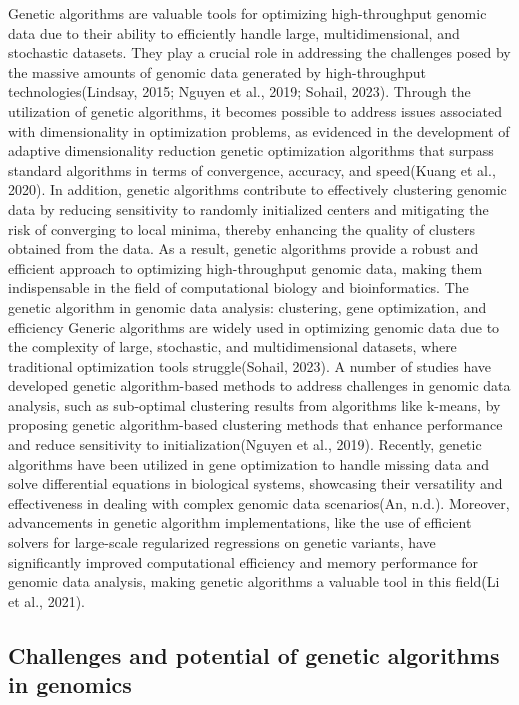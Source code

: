 \documentclass[
]{article}
\begin{document}
Genetic algorithms are valuable tools for optimizing high-throughput
genomic data due to their ability to efficiently handle large,
multidimensional, and stochastic datasets. They play a crucial role in
addressing the challenges posed by the massive amounts of genomic data
generated by high-throughput technologies(Lindsay, 2015; Nguyen et al.,
2019; Sohail, 2023). Through the utilization of genetic algorithms, it
becomes possible to address issues associated with dimensionality in
optimization problems, as evidenced in the development of adaptive
dimensionality reduction genetic optimization algorithms that surpass
standard algorithms in terms of convergence, accuracy, and speed(Kuang
et al., 2020). In addition, genetic algorithms contribute to effectively
clustering genomic data by reducing sensitivity to randomly initialized
centers and mitigating the risk of converging to local minima, thereby
enhancing the quality of clusters obtained from the data. As a result,
genetic algorithms provide a robust and efficient approach to optimizing
high-throughput genomic data, making them indispensable in the field of
computational biology and bioinformatics. The genetic algorithm in
genomic data analysis: clustering, gene optimization, and efficiency
Generic algorithms are widely used in optimizing genomic data due to the
complexity of large, stochastic, and multidimensional datasets, where
traditional optimization tools struggle(Sohail, 2023). A number of
studies have developed genetic algorithm-based methods to address
challenges in genomic data analysis, such as sub-optimal clustering
results from algorithms like k-means, by proposing genetic
algorithm-based clustering methods that enhance performance and reduce
sensitivity to initialization(Nguyen et al., 2019). Recently, genetic
algorithms have been utilized in gene optimization to handle missing
data and solve differential equations in biological systems, showcasing
their versatility and effectiveness in dealing with complex genomic data
scenarios(An, n.d.). Moreover, advancements in genetic algorithm
implementations, like the use of efficient solvers for large-scale
regularized regressions on genetic variants, have significantly improved
computational efficiency and memory performance for genomic data
analysis, making genetic algorithms a valuable tool in this field(Li et
al., 2021).

\subsection{Challenges and potential of genetic algorithms in
genomics}\label{challenges-and-potential-of-genetic-algorithms-in-genomics}
\end{document}

